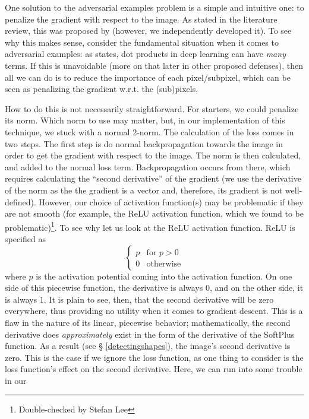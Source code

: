 One solution to the adversarial examples problem is a simple and intuitive one: to penalize the
gradient with respect to the image. As stated in the literature review, this was proposed by
\cite{gu2015deep} (however, we independently developed it). To see why this makes sense, consider
the fundamental situation when it comes to adversarial examples: as \cite{goodfellow2015explaining}
states, dot products in deep learning can have \textit{many} terms. If this is unavoidable (more
on that later in other proposed defenses), then all we can do is to reduce the importance of each
pixel/subpixel, which can be seen as penalizing the gradient w.r.t. the (sub)pixels.

How to do this is not necessarily straightforward. For starters, we could penalize its norm. Which
norm to use may matter, but, in our implementation of this technique, we stuck with a normal 2-norm.
The calculation of the loss comes in two steps. The first step is do normal backpropagation towards
the image in order to get the gradient with respect to the image. The norm is then calculated, and
added to the normal loss term. Backpropagation occurs from there, which requires calculating the
``second derivative'' of the gradient (we use the derivative of the norm as the the gradient is a
vector and, therefore, its gradient is not well-defined). However, our choice of activation
function(s) may be problematic if they are not smooth (for example, the
ReLU\cite{pmlr-v15-glorot11a} activation function, which we found to be
problematic)\footnote{Double-checked by Stefan Lee}. To see why let us look at the ReLU activation
function. ReLU is specified as
\[
    \begin{cases}p & \text{for }p > 0 \\ 0 & \text{otherwise}\end{cases}
\]
where $p$ is the activation potential coming into the activation function. On one side of this
piecewise function, the derivative is always $0$, and on the other side, it is always $1$. It is
plain to see, then, that the second derivative will be zero everywhere, thus providing no utility when
it comes to gradient descent. This is a flaw in the nature of its linear, piecewise behavior;
mathematically, the second derivative does \textit{approximately} exist in the form of the
derivative of the SoftPlus~\cite{NIPS2000_44968aec} function. As a result (see § \ref{detectingshapes}), the image's
second derivative is zero. This is the case if we ignore the loss function, as one thing to consider
is the loss function's effect on the second derivative. Here, we can run into some trouble in our
